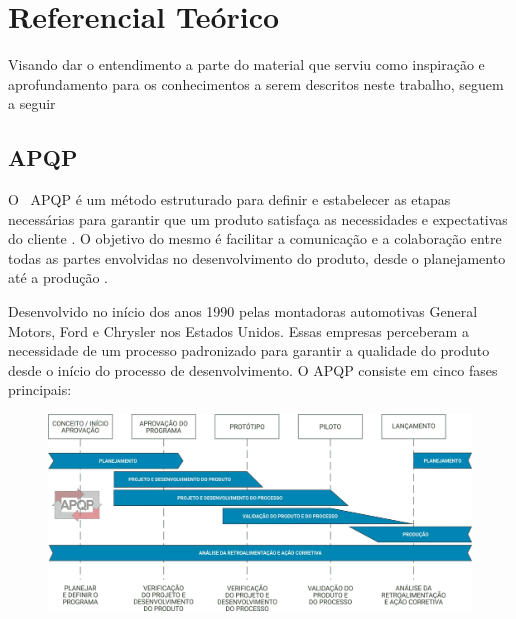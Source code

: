\chapter{Referencial Teórico}
\label{cap:fundamentacao-teorica}

Visando dar o entendimento a parte do material que serviu como inspiração e aprofundamento para os conhecimentos a serem descritos neste trabalho, seguem a seguir 

\section{APQP}

O \  \gls{APQP} é um método estruturado para definir e estabelecer as etapas necessárias para garantir que um produto satisfaça as necessidades e expectativas do cliente . O objetivo do mesmo é facilitar a comunicação e a colaboração entre todas as partes envolvidas no desenvolvimento do produto, desde o planejamento até a produção  \cite{apqp}.

Desenvolvido no início dos anos 1990 pelas montadoras automotivas General Motors, Ford e Chrysler nos Estados Unidos. Essas empresas perceberam a necessidade de um processo padronizado para garantir a qualidade do produto desde o início do processo de desenvolvimento. O  \gls{APQP} consiste em cinco fases principais:

\begin{figure}
    \centering
    \includegraphics[width=0.5\linewidth]{figuras/total.png}
    
    \label{fig:enter-label}
\end{figure}


